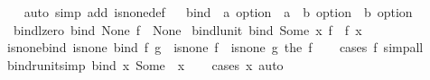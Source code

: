 \begin{isabellebody}
%
\isadelimproof
\ \ %
\endisadelimproof
%
\isatagproof
{}\isamarkupfalse%
\ {\isacharparenleft}{\kern0pt}auto\ simp\ add{\isacharcolon}{\kern0pt}\ is{\isacharunderscore}{\kern0pt}none{\isacharunderscore}{\kern0pt}def{\isacharparenright}{\kern0pt}\isanewline
\isanewline
\isanewline
{}%
\endisatagproof
{\isafoldproof}%
%
\isadelimproof
%
\endisadelimproof
\ \isamarkupfalse%
\ bind\ {\isacharcolon}{\kern0pt}{\isacharcolon}{\kern0pt}\ {\isachardoublequoteopen}{\isacharprime}{\kern0pt}a\ option\ {\isasymRightarrow}\ {\isacharparenleft}{\kern0pt}{\isacharprime}{\kern0pt}a\ {\isasymRightarrow}\ {\isacharprime}{\kern0pt}b\ option{\isacharparenright}{\kern0pt}\ {\isasymRightarrow}\ {\isacharprime}{\kern0pt}b\ option{\isachardoublequoteclose}\isanewline
{}\isanewline
\ \ bind{\isacharunderscore}{\kern0pt}lzero{\isacharcolon}{\kern0pt}\ {\isachardoublequoteopen}bind\ None\ f\ {\isacharequal}{\kern0pt}\ None{\isachardoublequoteclose}\isanewline
{\isacharbar}{\kern0pt}\ bind{\isacharunderscore}{\kern0pt}lunit{\isacharcolon}{\kern0pt}\ {\isachardoublequoteopen}bind\ {\isacharparenleft}{\kern0pt}Some\ x{\isacharparenright}{\kern0pt}\ f\ {\isacharequal}{\kern0pt}\ f\ x{\isachardoublequoteclose}\isanewline
\isanewline
{}\isamarkupfalse%
\ is{\isacharunderscore}{\kern0pt}none{\isacharunderscore}{\kern0pt}bind{\isacharcolon}{\kern0pt}\ {\isachardoublequoteopen}is{\isacharunderscore}{\kern0pt}none\ {\isacharparenleft}{\kern0pt}bind\ f\ g{\isacharparenright}{\kern0pt}\ {\isasymlongleftrightarrow}\ is{\isacharunderscore}{\kern0pt}none\ f\ {\isasymor}\ is{\isacharunderscore}{\kern0pt}none\ {\isacharparenleft}{\kern0pt}g\ {\isacharparenleft}{\kern0pt}the\ f{\isacharparenright}{\kern0pt}{\isacharparenright}{\kern0pt}{\isachardoublequoteclose}\isanewline
%
\isadelimproof
\ \ %
\endisadelimproof
%
\isatagproof
{}\isamarkupfalse%
\ {\isacharparenleft}{\kern0pt}cases\ f{\isacharparenright}{\kern0pt}\ simp{\isacharunderscore}{\kern0pt}all%
\endisatagproof
{\isafoldproof}%
%
\isadelimproof
\isanewline
%
\endisadelimproof
\isanewline
{}\isamarkupfalse%
\ bind{\isacharunderscore}{\kern0pt}runit{\isacharbrackleft}{\kern0pt}simp{\isacharbrackright}{\kern0pt}{\isacharcolon}{\kern0pt}\ {\isachardoublequoteopen}bind\ x\ Some\ {\isacharequal}{\kern0pt}\ x{\isachardoublequoteclose}\isanewline
%
\isadelimproof
\ \ %
\endisadelimproof
%
\isatagproof
{}\isamarkupfalse%
\ {\isacharparenleft}{\kern0pt}cases\ x{\isacharparenright}{\kern0pt}\ auto%
\endisatagproof
{\isafoldproof}%

\end{isabellebody}
